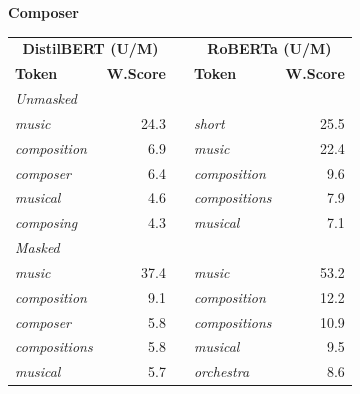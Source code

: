 \documentclass[11pt]{article}
\begin{document}
\vspace{4pt}\noindent\textbf{Composer}
\begin{center}\scriptsize
\begin{tabular}{lrllr}
\toprule
\multicolumn{2}{c}{\textbf{DistilBERT (U/M)}} & & \multicolumn{2}{c}{\textbf{RoBERTa (U/M)}} \\
\textbf{Token} & \textbf{W.Score} & & \textbf{Token} & \textbf{W.Score} \\
\midrule
\multicolumn{5}{l}{\textit{Unmasked}} \\
\emph{music} & 24.3 & & \emph{short} & 25.5 \\
\emph{composition} & 6.9 & & \emph{music} & 22.4 \\
\emph{composer} & 6.4 & & \emph{composition} & 9.6 \\
\emph{musical} & 4.6 & & \emph{compositions} & 7.9 \\
\emph{composing} & 4.3 & & \emph{musical} & 7.1 \\
\multicolumn{5}{l}{\textit{Masked}} \\
\emph{music} & 37.4 & & \emph{music} & 53.2 \\
\emph{composition} & 9.1 & & \emph{composition} & 12.2 \\
\emph{composer} & 5.8 & & \emph{compositions} & 10.9 \\
\emph{compositions} & 5.8 & & \emph{musical} & 9.5 \\
\emph{musical} & 5.7 & & \emph{orchestra} & 8.6 \\
\bottomrule
\end{tabular}
\end{center}
\end{document}
